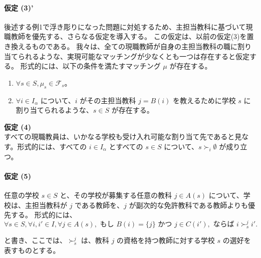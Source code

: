 \documentclass[12pt, a4paper]{article}
\theoremstyle{definition}
\theoremstyle{remark}
\theoremstyle{plain}
\begin{document}
\paragraph{\textbf{仮定 (3)'}}
後述する例1で浮き彫りになった問題に対処するため、主担当教科に基づいて現職教師を優先する、さらなる仮定を導入する。
この仮定は、以前の仮定(3)を置き換えるものである。
我々は、全ての現職教師が自身の主担当教科の職に割り当てられるような、実現可能なマッチングが少なくとも一つは存在すると仮定する。
形式的には、以下の条件を満たすマッチング $\mu$ が存在する。
\begin{enumerate}
    \item $\forall s \in S, \mu_s \in \mathcal{F}_s$。
    \item $\forall i \in I_\alpha$ について、$i$ がその主担当教科 $j=B(i)$ を教えるために学校 $s$ に割り当てられるような、$s \in S$ が存在する。
\end{enumerate}

\vspace{0.5\baselineskip}
\noindent\textbf{仮定 (4)} \\
すべての現職教員は、いかなる学校も受け入れ可能な割り当て先であると見なす。形式的には、すべての $i \in I_\alpha$ とすべての $s \in S$ について、$s \succ_i \emptyset$ が成り立つ。



\paragraph{\textbf{仮定 (5)}}
任意の学校 $s \in S$ と、その学校が募集する任意の教科 $j \in A(s)$ について、学校は、主担当教科が $j$ である教師を、$j$ が副次的な免許教科である教師よりも優先する。
形式的には、
\[
\forall s \in S, \forall i, i' \in I, \forall j \in A(s), \text{ もし } B(i) = \{j\} \text{ かつ } j \in C(i'), \text{ ならば } i \succ_{s}^j i'.
\]

と書き、ここでは、$\succ_s^j$ は、教科 $j$ の資格を持つ教師に対する学校 $s$ の選好を表すものとする。










\end{document}
